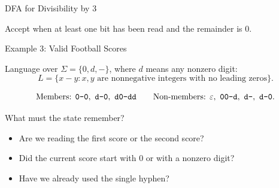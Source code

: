 \documentclass[10pt,aspectratio=169]{beamer}
\newcommand{\eps}{\varepsilon}
\begin{document}
\begin{frame}{DFA for Divisibility by 3}

\begin{center}
\end{center}

Accept when at least one bit has been read and the remainder is $0$.

\end{frame}

\begin{frame}{Example 3: Valid Football Scores}

Language over $\Sigma=\{0,d,-\}$, where $d$ means any nonzero digit:
\[
L=\{x-y: x,y\text{ are nonnegative integers with no leading zeros}\}.
\]

\[
\text{Members: }\text{\texttt{0-0}},\ \text{\texttt{d-0}},\ \text{\texttt{d0-dd}}
\qquad
\text{Non-members: }\eps,\ \text{\texttt{00-d}},\ \text{\texttt{d-}},\ \text{\texttt{d--0}}.
\]


What must the state remember?
\begin{itemize}
\item Are we reading the first score or the second score?
\item Did the current score start with $0$ or with a nonzero digit?
\item Have we already used the single hyphen?
\end{itemize}

\end{frame}
\end{document}
